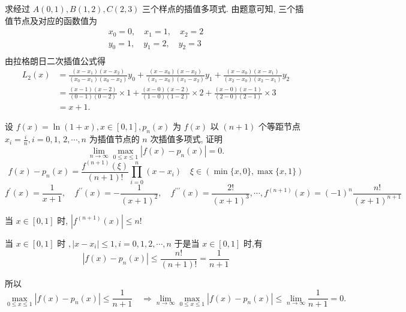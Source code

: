 \begin{tcolorbox}[enhanced,colback=10,colframe=9,breakable,coltitle=green!25!black,title=2024]
 求经过 $ A(0,1), B(1,2), C(2,3) $ 三个样点的插值多项式.
\tcblower
由题意可知, 三个插值节点及对应的函数值为
$$
\begin{array}{l}
x_{0}=0, \quad x_{1}=1, \quad x_{2}=2 \\
y_{0}=1, \quad y_{1}=2, \quad y_{2}=3 \\
\end{array}
$$
由拉格朗日二次插值公式得
$$
\begin{aligned}
L_{2}(x) & =\frac{\left(x-x_{1}\right)\left(x-x_{2}\right)}{\left(x_{0}-x_{1}\right)\left(x_{0}-x_{2}\right)} y_{0}+\frac{\left(x-x_{0}\right)\left(x-x_{2}\right)}{\left(x_{1}-x_{0}\right)\left(x_{1}-x_{2}\right)} y_{1}+\frac{\left(x-x_{0}\right)\left(x-x_{1}\right)}{\left(x_{2}-x_{0}\right)\left(x_{2}-x_{1}\right)} y_{2} \\
& =\frac{(x-1)(x-2)}{(0-1)(0-2)} \times 1+\frac{(x-0)(x-2)}{(1-0)(1-2)} \times 2+\frac{(x-0)(x-1)}{(2-0)(2-1)} \times 3 \\
& =x+1 .
\end{aligned}
$$
\end{tcolorbox}


\begin{tcolorbox}[enhanced,colback=10,colframe=9,breakable,coltitle=green!25!black,title=2024]

 设 $ f(x)=\ln (1+x), x \in[0,1], p_{n}(x) $ 为 $ f(x) $ 以 $ (n+1) $ 个等距节点 $ x_{i}=\frac{i}{n}, i=0,1 $, $ 2, \cdots, n $ 为插值节点的 $ n $ 次插值多项式, 证明
$$
\lim _{n \rightarrow \infty} \max _{0 \leqslant x \leqslant 1}\left|f(x)-p_{n}(x)\right|=0 .
$$
\tcblower
 $$ f(x)-p_{n}(x)=\frac{f^{(n+1)}(\xi)}{(n+1)!} \prod_{i=0}^{n}\left(x-x_{i}\right) \quad \xi \in(\min \{x, 0\}, \max \{x, 1\}) $$
$$f^{\prime}(x)=\frac{1}{x+1}, \quad f^{\prime \prime}(x)=-\frac{1}{(x+1)^{2}} ,\quad f^{\prime \prime \prime}(x)=\frac{2!}{(x+1)^{3}}, \cdots, f^{(n+1)}(x)=(-1)^{n} \frac{n!}{(x+1)^{n+1}}
$$

当 $ x \in[0,1] $ 时, $ \left|f^{(n+1)}(x)\right| \leqslant n! $

当 $ x \in[0,1] $ 时 $ ,\left|x-x_{i}\right| \leqslant 1, i=0,1,2, \cdots, n $
于是当 $ x \in[0,1] $ 时,有
$$
\left|f(x)-p_{n}(x)\right| \leqslant \frac{n!}{(n+1)!}=\frac{1}{n+1}
$$

所以
$$
\max _{0 \leqslant x \leqslant 1}\left|f(x)-p_{n}(x)\right| \leqslant \frac{1}{n+1} \quad \Rightarrow
\lim _{n \rightarrow \infty} \max _{0 \leqslant x \leqslant 1}\left|f(x)-p_{n}(x)\right| \leqslant \lim _{n \rightarrow \infty} \frac{1}{n+1}=0 .
$$

\end{tcolorbox}


